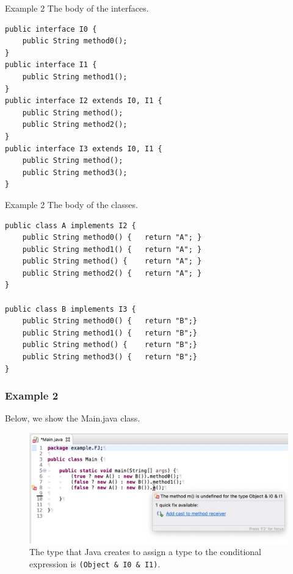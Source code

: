 \documentclass{beamer}
\begin{document}
\begin{frame}[fragile]{Example 2}
\boldmath
The body of the interfaces.	
\begin{flushleft}
\begin{lstlisting}[basicstyle=\scriptsize]
public interface I0 {
	public String method0();
}
public interface I1 {
	public String method1();
}
public interface I2 extends I0, I1 {
	public String method();
	public String method2();
}
public interface I3 extends I0, I1 {
	public String method();
	public String method3();
}
\end{lstlisting}
\end{flushleft}
\end{frame}


\begin{frame}[fragile]{Example 2}
\boldmath
The body of the classes.	
\begin{flushleft}
\begin{lstlisting}[basicstyle=\scriptsize]
public class A implements I2 {
	public String method0() {	return "A";	}
	public String method1() {	return "A";	}
	public String method() {	return "A";	}
	public String method2() {	return "A"; }
}

public class B implements I3 {
	public String method0() {	return "B";}
	public String method1() {	return "B";}
	public String method() {	return "B";}
	public String method3() {	return "B";}
}
\end{lstlisting}
\end{flushleft}
\end{frame}

\begin{frame}
\frametitle{Example 2}
Below, we show the Main.java class.
\begin{figure}
\centering
\includegraphics[width=1\linewidth]{images/example-intersection-type.png}
\caption{The type that Java creates to assign a type to the conditional expression is \texttt{(Object \& I0 \& I1)}.}
\label{fig:mainres}
\end{figure}
\end{frame}
\end{document}
